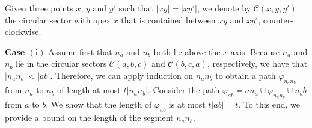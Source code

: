 \documentclass{cccg14}
\begin{document}
Given three points $x$, $y$ and $y'$ such that $|xy| = |xy'|$,
we denote by $\mathcal{C}(x,y,y')$ the circular sector with apex $x$ that is contained between $xy$ and $xy'$,
counter-clockwise.\vspace{.05in}

\textbf{Case $\boldsymbol{(i)}$} Assume first that $n_a$ and $n_b$ both lie above the $x$-axis.
Because $n_a$ and $n_b$ lie in the circular sectors $\mathcal C(a,b,c)$ and $\mathcal C(b, c, a)$, respectively, we have that $|n_a n_b| < |ab|$.
Therefore, we can apply induction on $n_an_b$ to obtain a path $\varphi_{n_an_b}$ from $n_a$ to $n_b$ of length at most $t|n_a n_b|$.
Consider the path $\varphi_{ab} = an_a\cup \varphi_{n_an_b}\cup n_b b$ from $a$ to $b$. 
We show that the length of $\varphi_{ab}$ is at most $t|ab| = t$.
To this end, we provide a bound on the length of the segment $n_an_b$.
\end{document}
